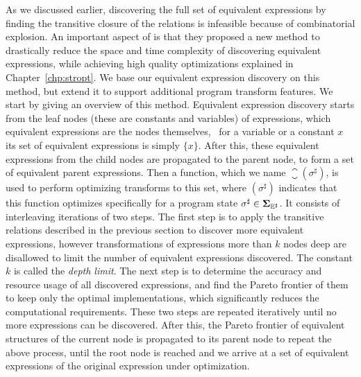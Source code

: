 As we discussed earlier, discovering the full set of equivalent expressions
by finding the transitive closure of the relations is infeasible because of
combinatorial explosion.  An important aspect of \soap{} is that they proposed
a new method to drastically reduce the space and time complexity of discovering
equivalent expressions, while achieving high quality optimizations explained in
Chapter~\ref{chp:stropt}.  We base our equivalent expression discovery on this
method, but extend it to support additional program transform features.  We
start by giving an overview of this method.  Equivalent expression discovery
starts from the leaf nodes (these are constants and variables) of expressions,
which equivalent expressions are the nodes themselves, \ie~for a variable or a
constant $x$ its set of equivalent expressions is simply $\{x\}$.  After this,
these equivalent expressions from the child nodes are propagated to the parent
node, to form a set of equivalent parent expressions.  Then a function, which
we name $\closure(\sigma^\sharp)$, is used to perform optimizing transforms
to this set, where $(\sigma^\sharp)$ indicates that this function optimizes
specifically for a program state $\sigma^\sharp \in \mathbf{\Sigma}_{\mathbb{E}^\sharp}$.  It consists
of interleaving iterations of two steps.  The first step is to apply the
transitive relations described in the previous section to discover more
equivalent expressions, however transformations of expressions more than
$k$ nodes deep are disallowed to limit the number of equivalent expressions
discovered.  The constant $k$ is called the \emph{depth limit}.  The next step
is to determine the accuracy and resource usage of all discovered expressions,
and find the Pareto frontier of them to keep only the optimal implementations,
which significantly reduces the computational requirements.  These two steps
are repeated iteratively until no more expressions can be discovered.  After
this, the Pareto frontier of equivalent structures of the current node is
propagated to its parent node to repeat the above process, until the root node
is reached and we arrive at a set of equivalent expressions of the original
expression under optimization.

